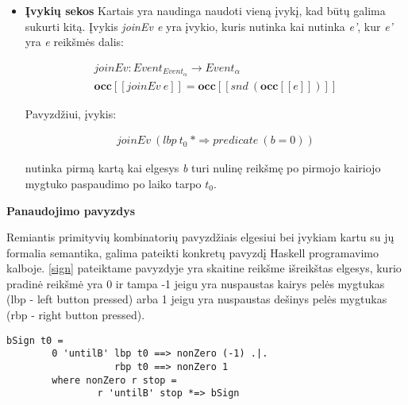 \begin{itemize}
	Pavyzdžiui, elgesys:

\begin{gather*}
b_{1}\ untilB\ (lbp\ t_{0}\ snapshot\ (sin\ time)) =$\Rightarrow$\ \lambda (e,y).\ b_{2}
\end{gather*}

	paima laiko, kai yra nuspaudžiamas kairysis mygtukas, sinusą, priskiria jį \textit{y} ir seka elgesiu \(b_{2}\), kuris galimai priklauso nuo \textit{y}. Nepaisant to, šį pavyzdį taip pat būtų galima realizuoti paimant kairiojo mygtuko paspaudimo įvykio laiką ir skaičiuojant sinusą, bendru atveju elgesio buvimas momentine kopija yra ganėtinai sudėtingas ir gali priklausyti nuo išorinių įvykių.

	\item \textbf{Įvykių sekos} Kartais yra naudinga naudoti vieną įvykį, kad būtų galima sukurti kitą. Įvykis \textit{joinEv e} yra įvykio, kuris nutinka kai nutinka \textit{e'}, kur \textit{e'} yra \textit{e} reikšmės dalis:

\begin{gather*}
joinEv: Event_{Event_{\alpha}} \rightarrow Event_{\alpha}\\
\textbf{occ}[[joinEv\ e]] = \textbf{occ}[[snd\ (\textbf{occ}[[e]])]]
\end{gather*}

	Pavyzdžiui, įvykis:

\begin{gather*}
joinEv\ (lbp\ t_{0}\ *\Rightarrow predicate\ (b = 0))
\end{gather*}

	nutinka pirmą kartą kai elgesys \textit{b} turi nulinę reikšmę po pirmojo kairiojo mygtuko paspaudimo po laiko tarpo \(t_{0}\).

\end{itemize}

\textbf{Panaudojimo pavyzdys}

Remiantis primityvių kombinatorių pavyzdžiais elgesiui bei įvykiam kartu su jų formalia semantika, galima pateikti konkretų pavyzdį Haskell programavimo kalboje. \ref{sign} pateiktame pavyzdyje yra skaitine reikšme išreikštas elgesys, kurio pradinė reikšmė yra 0 ir tampa -1 jeigu yra nuspaustas kairys pelės mygtukas (lbp - left button pressed) arba 1 jeigu yra nuspaustas dešinys pelės mygtukas (rbp - right button pressed).

\begin{lstlisting}[caption=- signalo funkcija nuo pelės mygtuko paspaudimo, label=sign]
	bSign t0 =
		0 'untilB' lbp t0 ==> nonZero (-1) .|.
				   rbp t0 ==> nonZero 1
		where nonZero r stop =
				r 'untilB' stop *=> bSign
\end{lstlisting}

